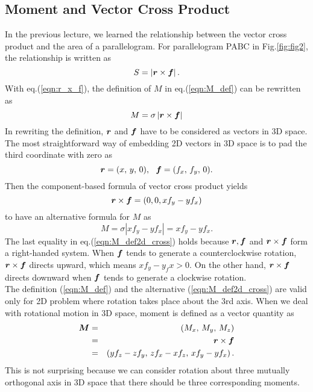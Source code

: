 \documentclass[10pt,a4j]{article}
\begin{document}
\subsection{Moment and Vector Cross Product}
In the previous lecture, we learned the relationship between the vector 
cross product and the area of a parallelogram. For parallelogram PABC in 
Fig.\ref{fig:fig2}, the relationship is  written as 
\begin{equation}
	S=\left| \mbox{\boldmath $r$} \times \mbox{\boldmath $f$} \right|.
	\label{eqn:r_x_f}
\end{equation}
With eq.(\ref{eqn:r_x_f}), the definition of $M$ in eq.(\ref{eqn:M_def}) can be rewritten as 
\begin{equation}
	M=\sigma\left| \mbox{\boldmath $r$} \times \mbox{\boldmath $f$} \right|
	\label{eqn:M_def2}
\end{equation}
In rewriting the definition, $\mbox{\boldmath $r$}$ and $\mbox{\boldmath $f$}$ have to be considered as vectors 
in 3D space. The most straightforward way of embedding 2D vectors in 3D space is 
to pad the third coordinate with zero as 
\begin{equation}
	\fat{r}=(x,\, y,\, 0), \ \ 
	\fat{f}=(f_x,\, f_y,\,0).
	\label{eqn:}
\end{equation}
Then the component-based formula of vector cross product yields 
\begin{equation}
	\mbox{\boldmath $r$}\times \mbox{\boldmath $f$}=(0,0,xf_y-yf_x)
\end{equation}
to have an alternative formula for $M$ as 
\begin{equation}
	M=\sigma \left| xf_y-yf_x \right| = xf_y-yf_x.
	\label{eqn:M_def2d_cross}
\end{equation}
The last equality in eq.(\ref{eqn:M_def2d_cross}) holds because 
$\mbox{\boldmath $r$}, \mbox{\boldmath $f$}$ and $\mbox{\boldmath $r$}\times\mbox{\boldmath $f$}$ form a right-handed system.
When $\mbox{\boldmath $f$}$ tends to generate a counterclockwise rotation, 
$\mbox{\boldmath $r$}\times\mbox{\boldmath $f$}$ directs upward, which means $xf_y-y_fx>0$.  
On the other hand, $\mbox{\boldmath $r$}\times\mbox{\boldmath $f$}$ directs downward when 
$\mbox{\boldmath $f$}$ tends to generate a clockwise rotation. \\

The definition (\ref{eqn:M_def}) and the alternative (\ref{eqn:M_def2d_cross}) 
are valid only for 2D problem where rotation takes place about the 3rd axis. 
When we deal with rotational motion in 3D space, moment is defined as a vector 
quantity as 
\begin{eqnarray}
	\mbox{\boldmath $M$} &=& 
	(M_x,\, M_y,\, M_z) \nonumber \\
	&=&
	\mbox{\boldmath $r$}\times\mbox{\boldmath $f$} \nonumber \\
	&=&
	\left(
		yf_z-zf_y
	,\,
		zf_x-xf_z
	,\,
		xf_y-yf_x
	\right).
	\label{eqn:}
\end{eqnarray}
This is not surprising because we can consider rotation about 
three mutually orthogonal axis in 3D space that there should be 
three corresponding moments.
\end{document}
